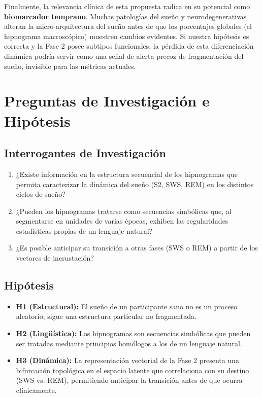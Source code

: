 Finalmente, la relevancia clínica de esta propuesta radica en su potencial como \textbf{biomarcador temprano}. Muchas patologías del sueño y neurodegenerativas alteran la micro-arquitectura del sueño antes de que los porcentajes globales (el hipnograma macroscópico) muestren cambios evidentes. Si nuestra hipótesis es correcta y la Fase 2 posee subtipos funcionales, la pérdida de esta diferenciación dinámica podría servir como una señal de alerta precoz de fragmentación del sueño, invisible para las métricas actuales.

\section{Preguntas de Investigación e Hipótesis}

\subsection*{Interrogantes de Investigación}

\begin{enumerate}
    \item ¿Existe información en la estructura secuencial de los hipnogramas que permita caracterizar la dinámica del sueño (S2, SWS, REM) en los distintos ciclos de sueño?
    \item ¿Pueden los hipnogramas tratarse como secuencias simbólicas que, al segmentarse en unidades de varias épocas, exhiben las regularidades estadísticas propias de un lenguaje natural?
    \item ¿Es posible anticipar su transición a otras fases (SWS o REM) a partir de los vectores de incrustación?
\end{enumerate}

\subsection*{Hipótesis}

\begin{itemize}
    \item \textbf{H1 (Estructural):} El sueño de un participante sano no es un proceso aleatorio; sigue una estructura particular no fragmentada.
    \item \textbf{H2 (Lingüística):} Los hipnogramas son secuencias simbólicas que pueden ser tratadas mediante principios homólogos a los de un lenguaje natural.
    \item \textbf{H3 (Dinámica):} La representación vectorial de la Fase 2 presenta una bifurcación topológica en el espacio latente que correlaciona con su destino (SWS vs. REM), permitiendo anticipar la transición antes de que ocurra clínicamente.
\end{itemize}

